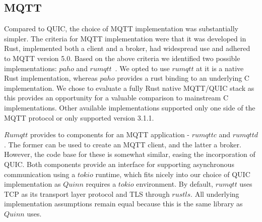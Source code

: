 \subsection{MQTT}\label{section:mqtt_impls}

Compared to QUIC, the choice of MQTT implementation was substantially simpler.
The criteria for MQTT implementation were that it was developed in Rust, implemented both a client and a broker, had widespread use and adhered to MQTT version 5.0.
Based on the above criteria we identified two possible implementations: $paho$ and $rumqtt$~\citep{bytebeam_rumqtt_2020}.
We opted to use $rumqtt$ at it is a native Rust implementation, whereas $paho$ provides a rust binding to an underlying C implementation.
We chose to evaluate a fully Rust native MQTT/QUIC stack as this provides an opportunity for a valuable comparison to mainstream C implementations.
Other available implementations supported only one side of the MQTT protocol or only supported version 3.1.1.

$Rumqtt$ provides to components for an MQTT application - $rumqttc$ and $rumqttd$.
The former can be used to create an MQTT client, and the latter a broker.
However, the code base for these is somewhat similar, easing the incorporation of QUIC.
Both components provide an interface for supporting asynchronous communication using a $tokio$ runtime, which fits nicely into our choice of QUIC implementation as $Quinn$ requires a $tokio$ environment.
By default, $rumqtt$ uses TCP as its transport layer protocol and TLS through $rustls$.
All underlying implementation assumptions remain equal because this is the same library as $Quinn$ uses.
